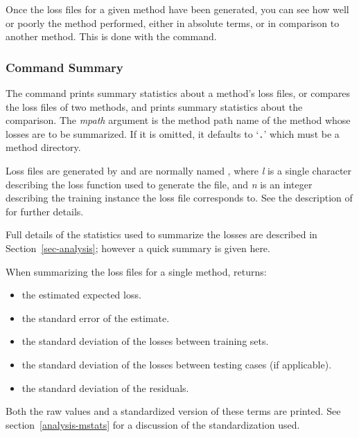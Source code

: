 %
%


Once the loss files for a given method have been generated, you can
see how well or poorly the method performed, either in absolute terms,
or in comparison to another method.  This is done with the \mstats{}
command.

\subsubsection*{Command Summary}

The \mstats{} command prints summary statistics about a method's loss
files, or compares the loss files of two methods, and prints summary
statistics about the comparison.  The \textit{mpath} argument is the
\delve{} method path name of the method whose losses are to be
summarized.  If it is omitted, it defaults to `\texttt{.}'  which must
be a \delve{} method directory.

Loss files are generated by \mloss{} and are normally named
, where \textit{l} is a single character describing
the loss function used to generate the file, and \textit{n} is an
integer describing the training instance the loss file corresponds to.
See the description of \mloss{} for further details.

Full details of the statistics used to summarize the losses are
described in Section~\ref{sec-analysis}; however a quick summary is
given here.

When summarizing the loss files for a single method, \mstats{}
returns:\vspace{-5pt}
\begin{itemize}
\item the estimated expected loss.
\item the standard error of the estimate.
\item the standard deviation of the losses between training sets.
\item the standard deviation of the losses between testing cases 
	(if applicable).
\item the standard deviation of the residuals.
\end{itemize}\vspace{-5pt}
Both the raw values and a standardized version of these terms are
printed.  See section~\ref{analysis-mstats} for a discussion of the
standardization used.

